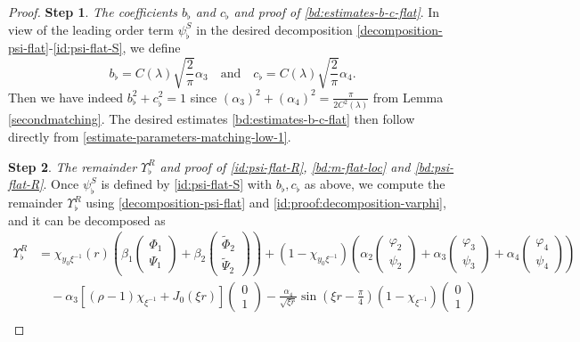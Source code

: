 \documentclass[11 pt]{amsart}
\theoremstyle{definition}
\theoremstyle{remark}
\numberwithin{equation}{section}
\begin{document}
\begin{proof}
\noindent \textbf{Step 1}. \emph{The coefficients $b_\flat$ and $c_\flat$ and proof of \eqref{bd:estimates-b-c-flat}}. In view of the leading order term $\psi^S_\flat$ in the desired decomposition \eqref{decomposition-psi-flat}-\eqref{id:psi-flat-S}, we define
$$
b_\flat= C(\lambda) \sqrt{\frac{2}{\pi}}\alpha_3 \quad \mbox{and} \quad c_\flat= C(\lambda)\sqrt{\frac{2}{\pi}}\alpha_4 .
$$
Then we have indeed $b_\flat^2+c_\flat^2=1$ since $(\alpha_3)^2 + (\alpha_4)^2 = \frac{\pi}{2 C^{2}(\lambda)}$ from Lemma \ref{secondmatching}. The desired estimates \eqref{bd:estimates-b-c-flat} then follow directly from \eqref{estimate-parameters-matching-low-1}.

\medskip


\noindent \textbf{Step 2}. \emph{The remainder $\Upsilon^R_\flat$ and proof of \eqref{id:psi-flat-R}, \eqref{bd:m-flat-loc} and \eqref{bd:psi-flat-R}}. Once $\psi_\flat^S$ is defined by \eqref{id:psi-flat-S} with $b_\flat,c_\flat$ as above, we compute the remainder $\Upsilon^R_\flat$ using \eqref{decomposition-psi-flat} and \eqref{id:proof:decomposition-varphi}, and it can be decomposed as
\begin{align*}
\Upsilon^R_\flat &=  \chi_{y_0\xi^{-1}}(r)\left(\beta_1\begin{pmatrix}\Phi_1\\ \Psi_1\end{pmatrix} +\beta_2\begin{pmatrix} \widetilde \Phi_2\\ \widetilde \Psi_2\end{pmatrix} \right)+(1-\chi_{y_0\xi^{-1}})\left(\alpha_2\begin{pmatrix}\varphi_2 \\ \psi_2 \end{pmatrix} +\alpha_3\begin{pmatrix}\varphi_3 \\ \psi_3 \end{pmatrix}+\alpha_4\begin{pmatrix}\varphi_4 \\ \psi_4 \end{pmatrix}\right) \\
&\quad - \alpha_3 \left[(\rho -1)\chi_{\xi^{-1}}+J_0(\xi r) \right]\begin{pmatrix} 0\\ 1 \end{pmatrix}-\frac{\alpha_4}{\sqrt{\xi r}}\sin(\xi r -\frac{\pi }{4}) (1-\chi_{\xi^{-1}})\begin{pmatrix} 0\\ 1 \end{pmatrix} \\

\end{align*}
\end{proof}
\end{document}
